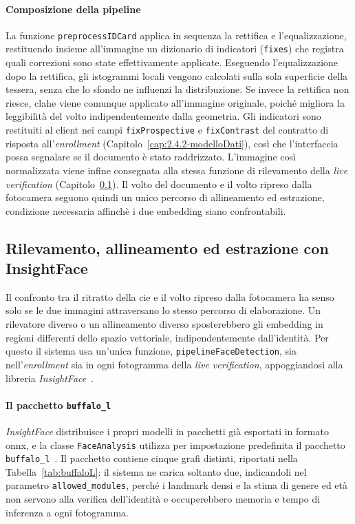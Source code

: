 \paragraph{Composizione della pipeline}
La funzione \texttt{preprocessIDCard} applica in sequenza la rettifica e l'equalizzazione, restituendo insieme all'immagine un dizionario di indicatori (\texttt{fixes}) che registra quali correzioni sono state effettivamente applicate.
Eseguendo l'equalizzazione dopo la rettifica, gli istogrammi locali vengono calcolati sulla sola superficie della tessera, senza che lo sfondo ne influenzi la distribuzione.
Se invece la rettifica non riesce, \gls{clahe} viene comunque applicato all'immagine originale, poiché migliora la leggibilità del volto indipendentemente dalla geometria.
Gli indicatori sono restituiti al client nei campi \texttt{fixProspective} e \texttt{fixContrast} del contratto di risposta all'\textit{enrollment} (Capitolo~\ref{cap:2.4.2-modelloDati}), così che l'interfaccia possa segnalare se il documento è stato raddrizzato.
L'immagine così normalizzata viene infine consegnata alla stessa funzione di rilevamento della \textit{live verification} (Capitolo~\ref{cap:3.2.2-faceAnalysis}).
Il volto del documento e il volto ripreso dalla fotocamera seguono quindi un unico percorso di allineamento ed estrazione, condizione necessaria affinchè i due embedding siano confrontabili.

\subsection{Rilevamento, allineamento ed estrazione con InsightFace}\label{cap:3.2.2-faceAnalysis}
Il confronto tra il ritratto della \gls{cie} e il volto ripreso dalla fotocamera ha senso solo se le due immagini attraversano lo stesso percorso di elaborazione. 
Un rilevatore diverso o un allineamento diverso sposterebbero gli embedding in regioni differenti dello spazio vettoriale, indipendentemente dall'identità.
Per questo il sistema usa un'unica funzione, \texttt{pipelineFaceDetection}, sia nell'\textit{enrollment} sia in ogni fotogramma della \textit{live verification}, appoggiandosi alla libreria \textit{InsightFace}~\cite{github-insightface}.

\paragraph{Il pacchetto \texttt{buffalo\_l}}
\textit{InsightFace} distribuisce i propri modelli in pacchetti già esportati in formato \gls{onnx}, e la classe \texttt{FaceAnalysis} utilizza per impostazione predefinita il pacchetto \texttt{buffalo\_l}~\cite{github-insightface}.
Il pacchetto contiene cinque grafi distinti, riportati nella Tabella~\ref{tab:buffaloL}: il sistema ne carica soltanto due, indicandoli nel parametro \texttt{allowed\_modules}, perché i landmark densi e la stima di genere ed età non servono alla verifica dell'identità e occuperebbero memoria e tempo di inferenza a ogni fotogramma.

